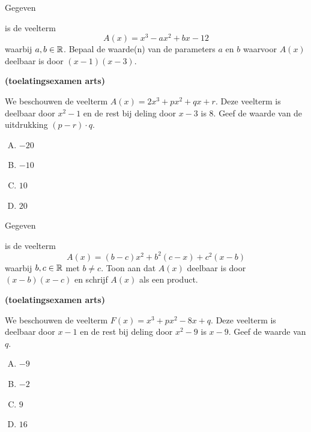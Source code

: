 \documentclass{ximera}
\begin{document}
\begin{Oefening}\setcounter{enumi}{10}
\hypertarget{oef3.10}{Gegeven} is de veelterm
\[
A(x) = x^3 - ax^2 + bx - 12
\]
waarbij $a,b \in \mathbb{R}$. Bepaal de waarde(n) van de parameters $a$ en $b$ waarvoor $A(x)$ deelbaar is door $(x-1)(x-3)$. 
\end{Oefening}

\begin{Oefening}\setcounter{enumi}{11} 
\hypertarget{oef3.11}{{\bf (toelatingsexamen arts)}}
We beschouwen de veelterm $A(x) = 2x^3 + px^2 + qx + r$. Deze veelterm is deelbaar door $x^2 - 1$ en de rest bij deling door $x-3$ is $8$. Geef de waarde van de uitdrukking $(p-r)\cdot q$.
\begin{multicols}{4} 
\begin{enumerate}[(A)]
\item 
$-20$
\item 
$-10$
\item 
$10$
\item 
$20$
\end{enumerate}
\end{multicols}
\end{Oefening}

\begin{Oefening}\setcounter{enumi}{12} 
\hypertarget{oef3.12}{Gegeven} is de veelterm
\[
A(x) = (b-c)x^2 + b^2(c-x) + c^2(x-b)
\]
waarbij $b,c \in \mathbb{R}$ met $b \neq c$. Toon aan dat $A(x)$ deelbaar is door $(x-b)(x-c)$ en schrijf $A(x)$ als een product. 
\end{Oefening}

\begin{Oefening}\setcounter{enumi}{13}  
\hypertarget{oef3.13}{{\bf (toelatingsexamen arts)}}
We beschouwen de veelterm $F(x) = x^3 + px^2 - 8x + q$. Deze veelterm is deelbaar door $x-1$ en de rest bij deling door $x^2-9$ is $x-9$. Geef de waarde van $q$.
\begin{multicols}{4} 
\begin{enumerate}[(A)]
\item 
$-9$
\item 
$-2$
\item 
$9$
\item 
$16$
\end{enumerate}
\end{multicols}
\end{Oefening}
\end{document}
